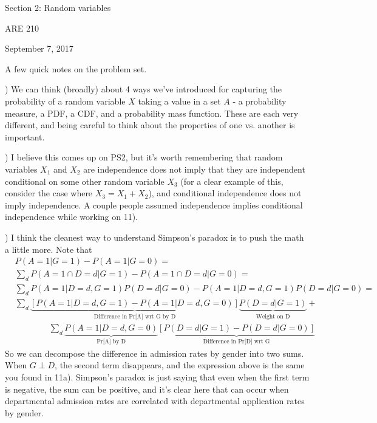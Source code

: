 \documentclass[12pt,english]{article}
\begin{document}
\begin{center}
{\Large{}Section 2: Random variables}
\par\end{center}{\Large \par}

\begin{center}
ARE 210
\par\end{center}

\begin{center}
September 7, 2017
\par\end{center}


A few quick notes on the problem set.

\vspace{1em}) We can think (broadly) about 4 ways we've introduced for capturing the probability of a random variable $X$ taking a value in a set $A$ - a probability measure, a PDF, a CDF, and a probability mass function. These are each very different, and being careful to think about the properties of one vs. another is important.

\vspace{1em}) I believe this comes up on PS2, but it's worth remembering that random variables $X_{1}$ and $X_{2}$ are independence does not imply that they are independent conditional on some other random variable $X_{3}$ (for a clear example of this, consider the case where $X_{3} = X_{1} + X_{2}$), and conditional independence does not imply independence. A couple people assumed independence implies conditional independence while working on 11).

\vspace{1em}) I think the cleanest way to understand Simpson's paradox is to push the math a little more. Note that
\begin{align*}
& P(A = 1 | G = 1) - P(A = 1 | G = 0) = \\
& \sum_{d} P(A = 1 \cap D = d | G = 1) - P(A = 1 \cap D = d | G = 0) = \\
& \sum_{d} P(A = 1 | D = d, G = 1) P(D = d | G = 0) - P(A = 1 | D = d, G = 1) P(D = d | G = 0) = \\
& \sum_{d} \underbrace{\left[ P(A = 1 | D = d, G = 1) - P(A = 1 | D = d, G = 0) \right]}_{\text{Difference in Pr[A] wrt G by D}} \underbrace{P(D = d | G = 1)}_{\text{Weight on D}} + \\
& \qquad\qquad \sum_{d} \underbrace{P(A = 1 | D = d, G = 0)}_{\text{Pr[A] by D}} \underbrace{[ P(D = d | G = 1) - P(D = d | G = 0) ]}_{\text{Difference in Pr[D] wrt G}}
\end{align*}
So we can decompose the difference in admission rates by gender into two sums. When $G \perp D$, the second term disappears, and the expression above is the same you found in 11a). Simpson's paradox is just saying that even when the first term is negative, the sum can be positive, and it's clear here that can occur when departmental admission rates are correlated with departmental application rates by gender.
\end{document}
